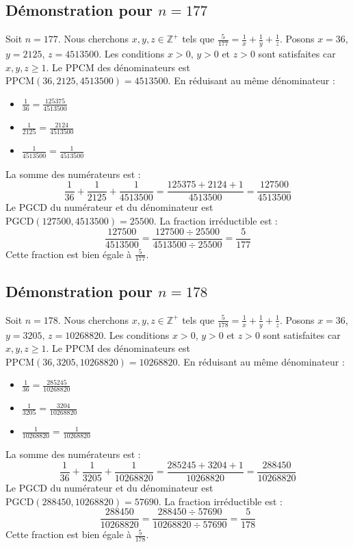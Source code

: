 \documentclass[11pt,a4paper]{article}
\begin{document}
\subsection{Démonstration pour $n = 177$}
Soit $n = 177$. Nous cherchons $x, y, z \in \mathbb{Z}^{+}$ tels que $\frac{5}{177} = \frac{1}{x} + \frac{1}{y} + \frac{1}{z}$.
Posons $x = 36$, $y = 2125$, $z = 4513500$.
Les conditions $x > 0$, $y > 0$ et $z > 0$ sont satisfaites car $x, y, z \geq 1$.
Le PPCM des dénominateurs est $\text{PPCM}(36, 2125, 4513500) = 4513500$.
En réduisant au même dénominateur :
\begin{itemize}
    \item $\frac{1}{36} = \frac{125375}{4513500}$
    \item $\frac{1}{2125} = \frac{2124}{4513500}$
    \item $\frac{1}{4513500} = \frac{1}{4513500}$
\end{itemize}
La somme des numérateurs est :
$$ \frac{1}{36} + \frac{1}{2125} + \frac{1}{4513500} = \frac{125375 + 2124 + 1}{4513500} = \frac{127500}{4513500} $$
Le PGCD du numérateur et du dénominateur est $\text{PGCD}(127500, 4513500) = 25500$.
La fraction irréductible est :
$$ \frac{127500}{4513500} = \frac{127500 \div 25500}{4513500 \div 25500} = \frac{5}{177} $$
Cette fraction est bien égale à $\frac{5}{177}$.

\subsection{Démonstration pour $n = 178$}
Soit $n = 178$. Nous cherchons $x, y, z \in \mathbb{Z}^{+}$ tels que $\frac{5}{178} = \frac{1}{x} + \frac{1}{y} + \frac{1}{z}$.
Posons $x = 36$, $y = 3205$, $z = 10268820$.
Les conditions $x > 0$, $y > 0$ et $z > 0$ sont satisfaites car $x, y, z \geq 1$.
Le PPCM des dénominateurs est $\text{PPCM}(36, 3205, 10268820) = 10268820$.
En réduisant au même dénominateur :
\begin{itemize}
    \item $\frac{1}{36} = \frac{285245}{10268820}$
    \item $\frac{1}{3205} = \frac{3204}{10268820}$
    \item $\frac{1}{10268820} = \frac{1}{10268820}$
\end{itemize}
La somme des numérateurs est :
$$ \frac{1}{36} + \frac{1}{3205} + \frac{1}{10268820} = \frac{285245 + 3204 + 1}{10268820} = \frac{288450}{10268820} $$
Le PGCD du numérateur et du dénominateur est $\text{PGCD}(288450, 10268820) = 57690$.
La fraction irréductible est :
$$ \frac{288450}{10268820} = \frac{288450 \div 57690}{10268820 \div 57690} = \frac{5}{178} $$
Cette fraction est bien égale à $\frac{5}{178}$.
\end{document}
